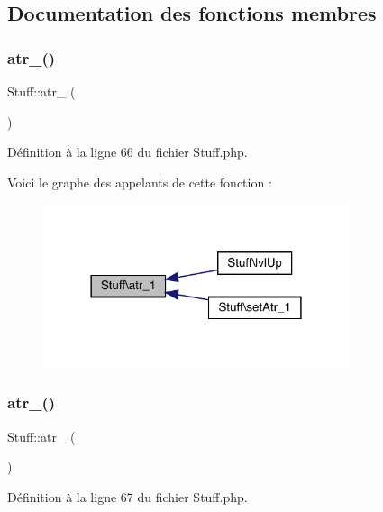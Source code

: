 \subsection{Documentation des fonctions membres}
\mbox{\label{class_stuff_a4afe7d4f33396df453f6fdc9c0ba3aa5}} 
\subsubsection{\texorpdfstring{atr\+\_()}{atr\_1()}}
{\footnotesize\ttfamily Stuff\+::atr\+\_ (\begin{DoxyParamCaption}{ }\end{DoxyParamCaption})}



Définition à la ligne 66 du fichier Stuff.\+php.

Voici le graphe des appelants de cette fonction \+:\nopagebreak
\begin{figure}[H]
\begin{center}
\leavevmode
\includegraphics[width=254pt]{class_stuff_a4afe7d4f33396df453f6fdc9c0ba3aa5_icgraph}
\end{center}
\end{figure}
\mbox{\label{class_stuff_a1bb01959da153fe1aacf0b3fe5454756}} 
\subsubsection{\texorpdfstring{atr\+\_()}{atr\_2()}}
{\footnotesize\ttfamily Stuff\+::atr\+\_ (\begin{DoxyParamCaption}{ }\end{DoxyParamCaption})}



Définition à la ligne 67 du fichier Stuff.\+php.


